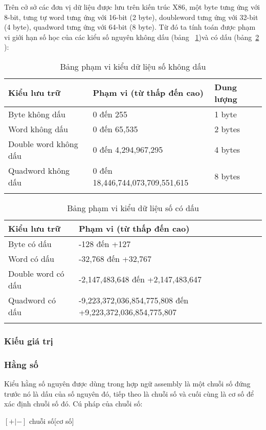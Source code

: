 		Trên cở sở các đơn vị dữ liệu được lưu trên kiến trúc X86, một byte tưng ứng với 8-bit, tưng tự word tưng ứng với 16-bit (2 byte), doubleword tưng ứng với 32-bit (4 byte), quadword tưng ứng với 64-bit (8 byte). Từ đó ta tính toán được phạm vi giới hạn số học của các kiểu số nguyên không dấu (bảng ~\ref{tb:DLKoDau})và có dấu (bảng~\ref{tb:DLCoDau} ): 
			\begin{longtable}{ | m{5cm} | m{6cm} | m{3cm} |}
			\hline
				Kiểu lưu trữ &	Phạm vi (từ thấp đến cao)&	Dung lượng\\
			\hline
			\hline
				Byte không dấu &	0 đến 255&	1 byte\\
			\hline
				Word không dấu	&0 đến 65,535&	2 bytes\\
			\hline
				Double word không dấu	 &0 đến 4,294,967,295&	4 bytes\\
			\hline
				Quadword không dấu	&0 đến 18,446,744,073,709,551,615&	8 bytes\\
			\hline
				\caption{Bảng phạm vi kiểu dữ liệu số không dấu}		
				\label{tb:DLKoDau}		
			\end{longtable}
		
			\begin{longtable}{ | m{5cm} | m{7cm} |}
			\hline
				Kiểu lưu trữ	& Phạm vi (từ thấp đến cao)\\
			\hline
			\hline
				Byte có dấu	& -128 đến +127\\
			\hline
				Word có dấu &	-32,768 đến +32,767\\
			\hline	
				Double word có dấu &	-2,147,483,648 đến +2,147,483,647\\
			\hline	
				Quadword có dấu	 & -9,223,372,036,854,775,808 đến +9,223,372,036,854,775,807 \\
			\hline
			\caption{Bảng phạm vi kiểu dữ liệu số có dấu}		
			\label{tb:DLCoDau}		
			\end{longtable}		
		
		\subsubsection{Kiếu giá trị}
		\subsubsection*{Hằng số}
		Kiểu hằng số nguyên được dùng trong hợp ngữ assembly là một chuỗi số đứng trước nó là dấu của số nguyên đó, tiếp theo là chuỗi số và cuối cùng là cơ số để xác định chuỗi số đó. Cú pháp của chuỗi số:		
		\begin{center}
			\selectfont
		 	$[{+|-}]$ chuỗi số$ [$cơ số$]$
		\end{center}
	
